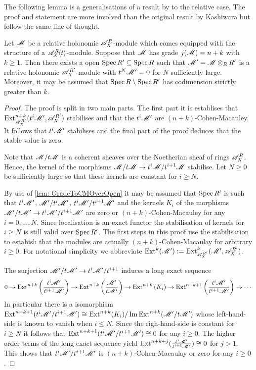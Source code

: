 The following lemma is a generalisations of a result by \cite{kashiwara1976b} to the relative case.
The proof and statement are more involved than the original result by Kashiwara but follow the same line of thought.
\begin{lemma}\label{lem: StabilisationtN}
  Let $\mathscr{M}$ be a relative holonomic $\mathscr{A}_X^R$-module which comes equipped with the structure of a $\mathscr{A}_X^R\mkern-5mu\left\langle t \right\rangle$-module.
  Suppose that $\mathscr{M}$ has grade $j(\mathscr{M}) = n+k$ with $k\geq 1$.
  Then there exists a open $\operatorname{Spec} R' \subseteq \operatorname{Spec} R$ such that $\mathscr{M}' = \mathscr{M} \otimes_{R} R'$ is a relative holonomic $\mathscr{A}_X^{R'}$-module with $t^N \mathscr{M}' = 0$ for $N$ sufficiently large. Moreover, it may be assumed that $\operatorname{Spec} R \setminus \operatorname{Spec} R'$ has codimension strictly greater than $k$.
\end{lemma}
\begin{proof}
  The proof is split in two main parts. The first part it is establises that $\operatorname{Ext}^{n+k}_{\mathscr{A}_X^{R'}}(t^i\mathscr{M}',\allowbreak\mathscr{A}_X^{R'})$ stabilises and that the $t^i\mathscr{M}'$ are $(n+k)$-Cohen-Macauley. It follows that $t^i\mathscr{M}'$ stabilises and the final part of the proof deduces that the stable value is zero.

  Note that $\mathscr{M}/t\mathscr{M}$ is a coherent sheaves over the Noetherian sheaf of rings $\mathscr{A}_X^R$.
  Hence, the kernel of the morphisms $\mathscr{M}/t\mathscr{M} \to t^i\mathscr{M} / t^{i+1}\mathscr{M}$ stabilise.
  Let $N\geq 0$ be sufficiently large so that these kernels are constant for $i\geq N$.

  By use of \cref{lem: GradeToCMOverOpen} it may be assumed that $\operatorname{Spec} R'$ is such that $t^i\mathscr{M}'$, $\mathscr{M}'/t^{i}\mathscr{M}'$, $t^i\mathscr{M}'/t^{i+1}\mathscr{M}'$ and the kernels $K_i$ of the morphisms $\mathscr{M}'/t\mathscr{M}' \to t^i \mathscr{M}'/ t^{i+1} \mathscr{M}'$ are zero or $(n+k)$-Cohen-Macauley for any $i=0,\ldots,N$.
  Since localisation is an exact functor the stabilisation of kernels for $i\geq N$ is still valid over $\operatorname{Spec} R'$.
  The first steps in this proof use the stabilisation to estabish that the modules are actually $(n+k)$-Cohen-Macaulay for arbitrary $i\geq 0$. For notational simplicity we abbreviate $\operatorname{Ext}^{k}(\mathscr{M}') :=\operatorname{Ext}^{k}_{\mathscr{A}_X^{R'}}(\mathscr{M}',\mathscr{A}_X^{R'})$.

  The surjection $\mathscr{M}'/t\mathscr{M}' \to t^i \mathscr{M}'/t^{i+1}$ induces a long exact sequence
  $$0 \to \operatorname{Ext}^{n+k}\left(\frac{t^i\mathscr{M}'}{ t^{i+1}\mathscr{M}'}\right) \to  \operatorname{Ext}^{n+k}\left(\frac{\mathscr{M}'}{t\mathscr{M}'}\right) \to \operatorname{Ext}^{n+k}\left(K_i\right) \to \operatorname{Ext}^{n+k+1}\left(\frac{t^i\mathscr{M}'}{ t^{i+1}\mathscr{M}'}\right)\to \cdots $$
  In particular there is a isomorphism $\operatorname{Ext}^{n+k+1}(t^i\mathscr{M}'/t^{i+1}\mathscr{M}') \cong \operatorname{Ext}^{n+k}(K_i)\allowbreak/\operatorname{Im} \operatorname{Ext}^{n+k}(\mathscr{M}'\allowbreak /t\mathscr{M}')$ whose left-hand-side is known to vanish when $i\leq N$.
  Since the righ-hand-side is constant for $i\geq N$ it follows that $\operatorname{Ext}^{n+k+1}(t^i\mathscr{M}'/t^{i+1}\mathscr{M}')\cong 0$ for any $i\geq 0$.
  The higher order terms of the long exact sequence yield $\operatorname{Ext}^{n+k+j}(\frac{t^i\mathscr{M}'}{ t^{i+1}\mathscr{M}'}) \cong 0$ for $j>1$.
  This shows that $t^i \mathscr{M}'/t^{i+1}\mathscr{M}'$ is $(n+k)$-Cohen-Macaulay or zero for any $i\geq 0$.



\end{proof}

